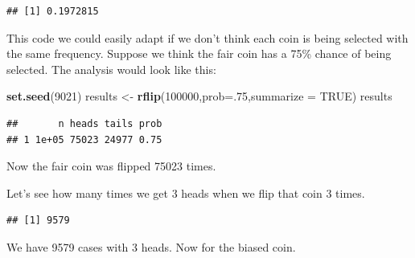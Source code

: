\documentclass[
]{book}
\newenvironment{Shaded}{\begin{snugshade}}{\end{snugshade}}
\newcommand{\DataTypeTok}[1]{\textcolor[rgb]{0.13,0.29,0.53}{#1}}
\newcommand{\DecValTok}[1]{\textcolor[rgb]{0.00,0.00,0.81}{#1}}
\newcommand{\FloatTok}[1]{\textcolor[rgb]{0.00,0.00,0.81}{#1}}
\newcommand{\KeywordTok}[1]{\textcolor[rgb]{0.13,0.29,0.53}{\textbf{#1}}}
\newcommand{\NormalTok}[1]{#1}
\newcommand{\OperatorTok}[1]{\textcolor[rgb]{0.81,0.36,0.00}{\textbf{#1}}}
\newcommand{\OtherTok}[1]{\textcolor[rgb]{0.56,0.35,0.01}{#1}}
\newcommand{\StringTok}[1]{\textcolor[rgb]{0.31,0.60,0.02}{#1}}
\begin{document}
\begin{verbatim}
## [1] 0.1972815
\end{verbatim}

This code we could easily adapt if we don't think each coin is being selected with the same frequency. Suppose we think the fair coin has a 75\% chance of being selected. The analysis would look like this:

\begin{Shaded}
\begin{Highlighting}[]
\KeywordTok{set.seed}\NormalTok{(}\DecValTok{9021}\NormalTok{)}
\NormalTok{results <-}\StringTok{ }\KeywordTok{rflip}\NormalTok{(}\DecValTok{100000}\NormalTok{,}\DataTypeTok{prob=}\NormalTok{.}\DecValTok{75}\NormalTok{,}\DataTypeTok{summarize =} \OtherTok{TRUE}\NormalTok{)}
\NormalTok{results}
\end{Highlighting}
\end{Shaded}

\begin{verbatim}
##       n heads tails prob
## 1 1e+05 75023 24977 0.75
\end{verbatim}

Now the fair coin was flipped 75023 times.

Let's see how many times we get 3 heads when we flip that coin 3 times.

\begin{Shaded}
\end{Shaded}

\begin{verbatim}
## [1] 9579
\end{verbatim}

We have 9579 cases with 3 heads. Now for the biased coin.

\begin{Shaded}
\end{Shaded}
\end{document}
